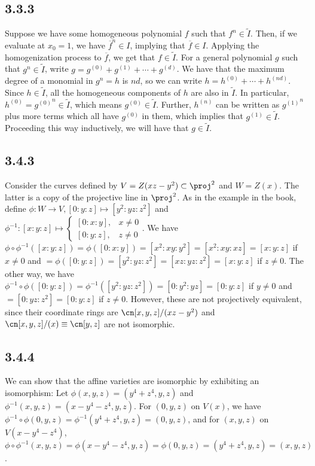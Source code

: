 \documentclass{article}
\newcommand{\conj}{\overline}
\begin{document}
\subsection*{3.3.3}
Suppose we have some homogeneous polynomial $f$ such that $f^n\in\tilde{I}$. Then, if we evaluate at $x_0=1$, we have $\conj{f}^n\in I$, implying that $\conj{f}\in I$. Applying the homogenization process to $\conj{f}$, we get that $f\in\tilde{I}$. For a general polynomial $g$ such that $g^n\in\tilde{I}$, write $g=g^{(0)}+g^{(1)}+\cdots+g^{(d)}$. We have that the maximum degree of a monomial in $g^n=h$ is $nd$, so we can write $h=h^{(0)}+\cdots+h^{(nd)}$. Since $h\in\tilde{I}$, all the homogeneous components of $h$ are also in $\tilde{I}$. In particular, $h^{(0)}={g^{(0)}}^n\in\tilde{I}$, which means $g^{(0)}\in\tilde{I}$. Further, $h^{(n)}$ can be written as ${g^{(1)}}^n$ plus more terms which all have $g^{(0)}$ in them, which implies that $g^{(1)}\in\tilde{I}$. Proceeding this way inductively, we will have that $g\in\tilde{I}$.
\subsection*{3.4.3}
Consider the curves defined by $V=Z(xz-y^2)\subset\proj^2$ and $W=Z(x)$. The latter is a copy of the projective line in $\proj^2$. As in the example in the book, define $\phi:W\to V, [0:y:z]\mapsto [y^2:yz:z^2]$ and $\phi^{-1}:[x:y:z]\mapsto
\begin{cases}
    [0:x:y],&x\neq0\\
    [0:y:z],&z\neq0
\end{cases}$. 
We have $\phi\circ\phi^{-1}([x:y:z])=\phi([0:x:y])=[x^2:xy:y^2]=[x^2:xy:xz]=[x:y:z]$ if $x\neq0$ and $=\phi([0:y:z])=[y^2:yz:z^2]=[xz:yz:z^2]=[x:y:z]$ if $z\neq0$. The other way, we have $\phi^{-1}\circ\phi([0:y:z])=\phi^{-1}([y^2:yz:z^2])=[0:y^2:yz]=[0:y:z]$ if $y\neq0$ and $=[0:yz:z^2]=[0:y:z]$ if $z\neq0$. However, these are not projectively equivalent, since their coordinate rings are $\cn[x,y,z]/(xz-y^2)$ and $\cn[x,y,z]/(x)\equiv\cn[y,z]$ are not isomorphic.
\subsection*{3.4.4}
We can show that the affine varieties are isomorphic by exhibiting an isomorphism: Let $\phi(x,y,z)=(y^4+z^4,y,z)$ and $\phi^{-1}(x,y,z)=(x-y^4-z^4,y,z)$. For $(0,y,z)$ on $V(x)$, we have $\phi^{-1}\circ\phi(0,y,z)=\phi^{-1}(y^4+z^4,y,z)=(0,y,z)$, and for $(x,y,z)$ on $V(x-y^4-z^4)$, $\phi\circ\phi^{-1}(x,y,z)=\phi(x-y^4-z^4,y,z)=\phi(0,y,z)=(y^4+z^4,y,z)=(x,y,z)$.
\end{document}
